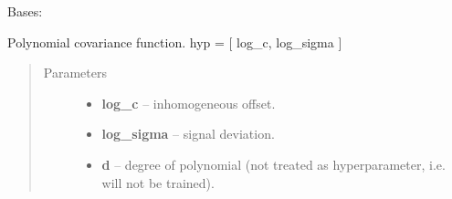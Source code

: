 \documentclass[letterpaper,10pt,english]{sphinxmanual}
\begin{document}
\begin{fulllineitems}
\label{pyGPs.Core:pyGPs.Core.cov.Poly}
Bases: {\hyperref[pyGPs.Core:pyGPs.Core.cov.Kernel]{}}

Polynomial covariance function. hyp = {[} log\_c, log\_sigma {]}
\begin{quote}\begin{description}
\item[{Parameters}] \leavevmode\begin{itemize}
\item {} 
\textbf{log\_c} -- inhomogeneous offset.

\item {} 
\textbf{log\_sigma} -- signal deviation.

\item {} 
\textbf{d} -- degree of polynomial (not treated as hyperparameter, i.e. will not be trained).

\end{itemize}

\end{description}\end{quote}

\begin{fulllineitems}
\label{pyGPs.Core:pyGPs.Core.cov.Poly.getCovMatrix}
\end{fulllineitems}


\begin{fulllineitems}
\label{pyGPs.Core:pyGPs.Core.cov.Poly.getDerMatrix}
\end{fulllineitems}


\end{fulllineitems}

\end{document}
